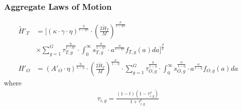 \documentclass[11pt]{beamer}
\begin{document}
\begin{frame}
	\frametitle{Aggregate Laws of Motion} 
	\label{laws}
	\small
	\begin{align}
		\widetilde{H}'_{T} & = \Bigg[ \left(\kappa \cdot \gamma \cdot \eta\right)^{\frac{\eta}{1-\eta\gamma}} \cdot \left(\tfrac{2\widetilde{H}_T}{M}\right)^{\frac{\sigma}{1-\eta\gamma}}\nonumber\\
		& \times \sum_{g=1}^G \tau_{T,g}^\frac{\eta}{1-\eta\gamma} \cdot \int_0^\infty  s_{T,g}^\frac{\phi}{1-\eta\gamma} \cdot a^\frac{\alpha}{1-\eta\gamma}  f_{T,g}(a)da \Bigg]^\frac{\beta}{\sigma} \nonumber\\  
		{H}'_{O} & = \left({A'}_O \cdot \eta\right)^\frac{\eta}{1-\eta} \cdot \left(\tfrac{2\widetilde{H}_T}{M}\right)^\frac{\sigma}{1-\eta} \cdot  \sum_{g=1}^G \tau_{O,g}^\frac{\eta}{1-\eta} \cdot \int_0^\infty s_{O,g}^\frac{\phi}{1-\eta} \cdot a^{\frac{\alpha}{1-\eta}} f_{O,g}(a)da \nonumber
	\end{align}
	where
	\begin{align}
		\tau_{i,g} =\frac{(1-t)(1-\tau^{\omega}_{i,g})}{1+\tau^e_{i,g}} \nonumber
	\end{align}
	\hyperlink{eqm}{}
\end{frame}
\end{document}
